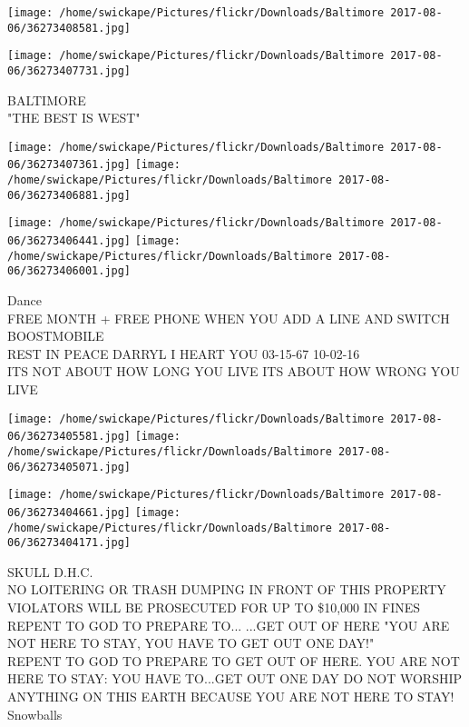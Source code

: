 \documentclass[10pt,letterpaper]{article}
\begin{document}
\texttt{[image: /home/swickape/Pictures/flickr/Downloads/Baltimore 2017-08-06/36273408581.jpg]}

\vspace{0.25in}
\texttt{[image: /home/swickape/Pictures/flickr/Downloads/Baltimore 2017-08-06/36273407731.jpg]}

BALTIMORE\\
"THE BEST IS WEST"\\
\pagebreak

\texttt{[image: /home/swickape/Pictures/flickr/Downloads/Baltimore 2017-08-06/36273407361.jpg]}
\texttt{[image: /home/swickape/Pictures/flickr/Downloads/Baltimore 2017-08-06/36273406881.jpg]}

\texttt{[image: /home/swickape/Pictures/flickr/Downloads/Baltimore 2017-08-06/36273406441.jpg]}
\texttt{[image: /home/swickape/Pictures/flickr/Downloads/Baltimore 2017-08-06/36273406001.jpg]}

Dance\\
FREE MONTH + FREE PHONE WHEN YOU ADD A LINE AND SWITCH BOOSTMOBILE\\
REST IN PEACE DARRYL I HEART YOU 03{-}15{-}67 10{-}02{-}16\\
ITS NOT ABOUT HOW LONG YOU LIVE ITS ABOUT HOW WRONG YOU LIVE\\
\pagebreak

\texttt{[image: /home/swickape/Pictures/flickr/Downloads/Baltimore 2017-08-06/36273405581.jpg]}
\texttt{[image: /home/swickape/Pictures/flickr/Downloads/Baltimore 2017-08-06/36273405071.jpg]}

\texttt{[image: /home/swickape/Pictures/flickr/Downloads/Baltimore 2017-08-06/36273404661.jpg]}
\texttt{[image: /home/swickape/Pictures/flickr/Downloads/Baltimore 2017-08-06/36273404171.jpg]}

SKULL D.H.C.\\
NO LOITERING OR TRASH DUMPING IN FRONT OF THIS PROPERTY VIOLATORS WILL BE PROSECUTED FOR UP TO \$10,000 IN FINES REPENT TO GOD TO PREPARE TO... ...GET OUT OF HERE "YOU ARE NOT HERE TO STAY, YOU HAVE TO GET OUT ONE DAY!"\\
REPENT TO GOD TO PREPARE TO GET OUT OF HERE.  YOU ARE NOT HERE TO STAY: YOU HAVE TO...GET OUT ONE DAY DO NOT WORSHIP ANYTHING ON THIS EARTH BECAUSE YOU ARE NOT HERE TO STAY!\\
Snowballs\\
\pagebreak
\end{document}
